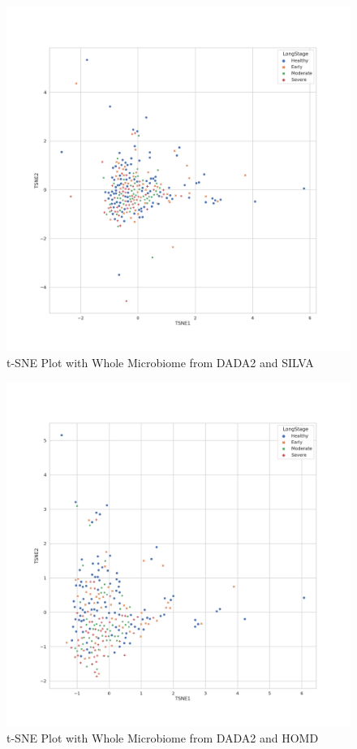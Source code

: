 \documentclass[a4paper]{article}
\begin{document}
            \begin{figure}[p]
                \centering
                \includegraphics[width=0.6 \linewidth]{figures/tSNE/Whole/whole.DADA2.silva.png}
                \caption{t-SNE Plot with Whole Microbiome from DADA2 and SILVA}
                \label{fig:tsne-whole-dada2-silva}
            \end{figure}

            \begin{figure}[p]
                \centering
                \includegraphics[width=0.6 \linewidth]{figures/tSNE/Whole/whole.DADA2.homd.png}
                \caption{t-SNE Plot with Whole Microbiome from DADA2 and HOMD}
                \label{fig:tsne-whole-dada2-homd}
            \end{figure}
\end{document}
